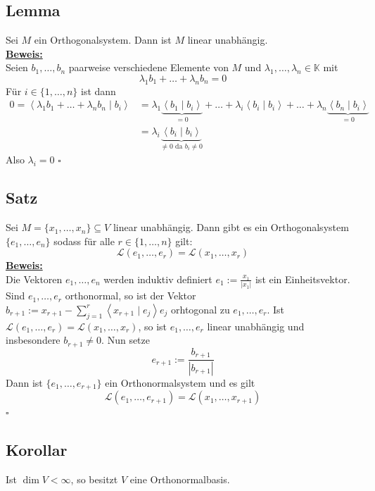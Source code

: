 \subsection{Lemma} %
\label{sub:lemma}
Sei $M$ ein Orthogonalsystem. Dann ist $M$ linear unabhängig.
\vspace{10pt} \\
\underline{\textbf{Beweis:}} \\
Seien $b_1, \ldots , b_n$ paarweise verschiedene Elemente von $M$ und $\lambda_1, \ldots , \lambda_n \in \mathds{K}$ mit 
\[
	\lambda_1 b_1 + \ldots + \lambda_n b_n = 0
\]
Für $i \in \{1, \ldots , n\}$ ist dann
\begin{align*}
	0= \left\langle \lambda_1 b_1 + \ldots + \lambda_n b_n \mid b_i \right\rangle &= \lambda_1 \underbrace{\left\langle b_1 \mid b_i \right\rangle}_{= 0} 
	+ \ldots + \lambda_i \left\langle b_i \mid b_i \right\rangle + \ldots + \lambda_n \underbrace{\left\langle b_n \mid b_i \right\rangle}_{=0} \\
	&= \lambda_i \underbrace{\left\langle b_i \mid b_i \right\rangle}_{\not= 0 \text{ da } b_i \not= 0}
\end{align*}
Also $\lambda_i = 0$ \hfill \( \square \)

\subsection{Satz} %
\label{sub:satz}
Sei $M= \{ x_1, \ldots ,x_n \} \subseteq V$ linear unabhängig. Dann gibt es ein Orthogonalsystem $\{ e_1, \ldots , e_n \}$ sodass für alle $r \in \{1, \ldots ,n \}$ gilt:
\[
	\mathcal{L} ( e_1 , \ldots , e_r) = \mathcal{L} (x_1, \ldots , x_r)
\]
\underline{\textbf{Beweis:}} \\
Die Vektoren $e_1, \ldots , e_n$ werden induktiv definiert $e_1 := \frac{x_1}{|x_1|} $ ist ein Einheitsvektor. Sind $e_1, \ldots , e_r$ orthonormal, so ist der Vektor
$b_{r+1} := x_{r+1}- \sum\limits_{j=1}^{r} \left\langle x_{r+1} \mid e_j \right\rangle e_j $ orhtogonal zu $e_1, \ldots , e_r$. Ist $\mathcal{L} (e_1, \ldots , e_r)
= \mathcal{L} (x_1, \ldots , x_r)$, so ist $e_1, \ldots , e_r$ linear unabhängig und insbesondere $b_{r+1} \not= 0$. Nun setze
\[
	e_{r+1} := \frac{b_{r+1}}{|b_{r+1}|} 
\]
Dann ist $\{ e_1, \ldots , e_{r+1} \}$ ein Orthonormalsystem und es gilt
\[
	\mathcal{L} (e_1, \ldots , e_{r+1}) = \mathcal{L} (x_1, \ldots , x_{r+1})
\]
\hfill \( \square \)

\subsection{Korollar} %
\label{sub:korollar_14.9}
Ist $\dim V < \infty$, so besitzt $V$ eine Orthonormalbasis.

